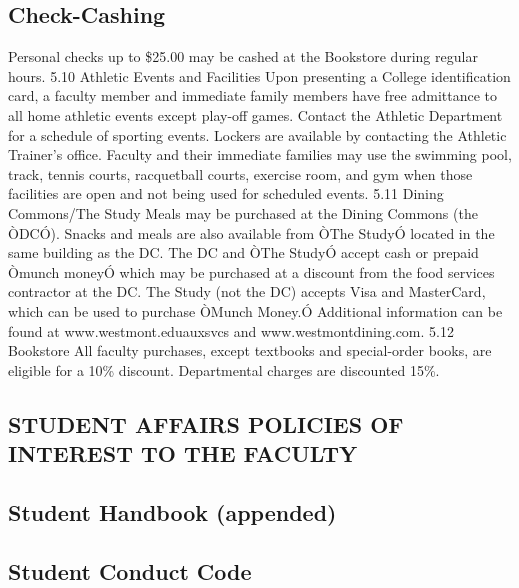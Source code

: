 \documentclass[letterpaper, 11pt]{article}
\begin{document}
	\subsection{Check-Cashing}
		Personal checks up to \$25.00 may be cashed at the Bookstore during regular hours.
		5.10 Athletic Events and Facilities
		Upon presenting a College identification card, a faculty member and immediate family members have free admittance to all home athletic events except play-off games.  Contact the Athletic Department for a schedule of sporting events.  Lockers are available by contacting the Athletic Trainer's office.  Faculty and their immediate families may use the swimming pool, track, tennis courts, racquetball courts, exercise room, and gym when those facilities are open and not being used for scheduled events.
		5.11 Dining Commons/The Study
		Meals may be purchased at the Dining Commons (the ÒDCÓ).  Snacks and meals are also available from ÒThe StudyÓ located in the same building as the DC.  The DC and ÒThe StudyÓ accept cash or prepaid Òmunch moneyÓ which may be purchased at a discount from the food services contractor at the DC.  The Study (not the DC) accepts Visa and MasterCard, which can be used to purchase ÒMunch Money.Ó  Additional information can be found at www.westmont.eduauxsvcs and www.westmontdining.com.
		5.12 Bookstore
		All faculty purchases, except textbooks and special-order books, are eligible
		for a 10\% discount.  Departmental charges are discounted 15\%.

	\subsection{STUDENT AFFAIRS POLICIES OF INTEREST TO THE FACULTY}
	\subsection{Student Handbook (appended)}
	\subsection{Student Conduct Code}
\end{document}
